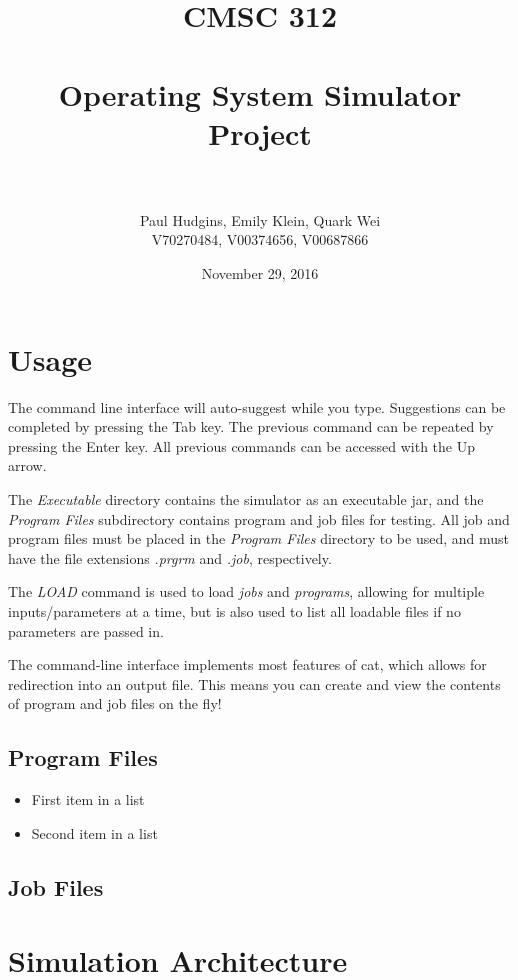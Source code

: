 \documentclass[paper=a4, fontsize=11pt]{scrartcl} %
\title{	
\normalfont \normalsize 
\textsc{CMSC 312} \\ [25pt] %
\horrule{0.5pt} \\[0.4cm] %
\huge Operating System Simulator Project \\ %
\horrule{2pt} \\[0.5cm] %
}
\author{Paul Hudgins, Emily Klein, Quark Wei%
\\ \normalsize V70270484, V00374656, V00687866}
\date{\normalsize November 29, 2016}%
\numberwithin{equation}{section} %
\numberwithin{figure}{section} %
\numberwithin{table}{section} %
\begin{document}
\maketitle %


\section{Usage}

The command line interface will auto-suggest while you type. Suggestions can be completed by pressing the Tab key. The previous command can be repeated by pressing the Enter key. All previous commands can be accessed with the Up arrow.

The \textit{Executable} directory contains the simulator as an executable jar, and the \textit{Program Files} subdirectory contains program and job files for testing. All job and program files must be placed in the \textit{Program Files} directory to be used, and must have the file extensions \textit{.prgrm} and \textit{.job}, respectively.

The \textit{LOAD} command is used to load \textit{jobs} and \textit{programs}, allowing for multiple inputs/parameters at a time, but is also used to list all loadable files if no parameters are passed in.

The command-line interface implements most features of cat, which allows for redirection into an output file. This means you can create and view the contents of program and job files on the fly!

\subsection{Program Files}

\begin{itemize}
	\item First item in a list 
	\item Second item in a list 
\end{itemize}

\subsection{Job Files}


\section{Simulation Architecture}
\end{document}
